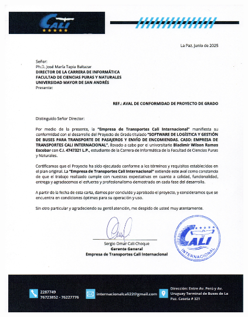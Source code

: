 \begin{figure}[H]
	\centering
	\includegraphics[width=0.96\textwidth]{imagenes/carta_aval_empresa.jpg}
\end{figure}